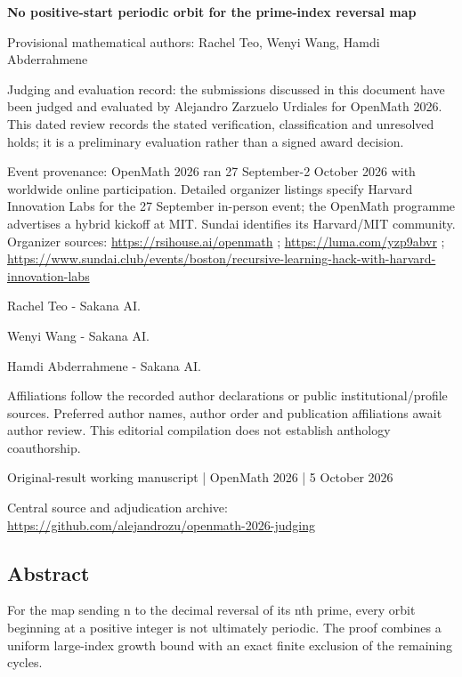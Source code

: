 \documentclass[11pt,a4paper]{article}
\begin{document}
{\LARGE\bfseries No positive-start periodic orbit for the prime-index reversal map\par}\medskip
{\small Provisional mathematical authors: Rachel Teo, Wenyi Wang, Hamdi Abderrahmene\par}\medskip
{\small Judging and evaluation record: the submissions discussed in this document have been judged and evaluated by Alejandro Zarzuelo Urdiales for OpenMath 2026. This dated review records the stated verification, classification and unresolved holds; it is a preliminary evaluation rather than a signed award decision.\par}

{\small Event provenance: OpenMath 2026 ran 27 September-2 October 2026 with worldwide online participation. Detailed organizer listings specify Harvard Innovation Labs for the 27 September in-person event; the OpenMath programme advertises a hybrid kickoff at MIT. Sundai identifies its Harvard/MIT community. Organizer sources: \url{https://rsihouse.ai/openmath} ; \url{https://luma.com/yzp9abvr} ; \url{https://www.sundai.club/events/boston/recursive-learning-hack-with-harvard-innovation-labs}\par}

{\small Rachel Teo  -  Sakana AI.\par}

{\small Wenyi Wang  -  Sakana AI.\par}

{\small Hamdi Abderrahmene  -  Sakana AI.\par}

{\small Affiliations follow the recorded author declarations or public institutional/profile sources. Preferred author names, author order and publication affiliations await author review. This editorial compilation does not establish anthology coauthorship.\par}

{\small Original-result working manuscript | OpenMath 2026 | 5 October 2026\par}\medskip
{\small Central source and adjudication archive: \url{https://github.com/alejandrozu/openmath-2026-judging}\par}

\subsection{Abstract}
For the map sending n to the decimal reversal of its nth prime, every orbit beginning at a positive integer is not ultimately periodic. The proof combines a uniform large-index growth bound with an exact finite exclusion of the remaining cycles.
\end{document}
